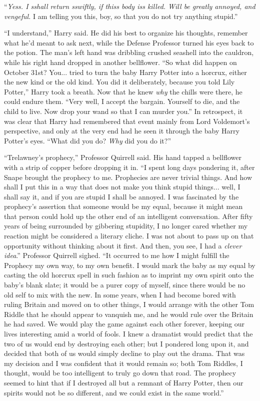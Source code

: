 ``\emph{Yess. I sshall return sswiftly, if thiss body iss killed. Will be greatly annoyed, and vengeful.} I am telling you this, boy, so that you do not try anything stupid.''

``I understand,'' Harry said. He did his best to organize his thoughts, remember what he'd meant to ask next, while the Defense Professor turned his eyes back to the potion. The man's left hand was dribbling crushed seashell into the cauldron, while his right hand dropped in another bellflower. ``So what did happen on October 31st? You... tried to turn the baby Harry Potter into a horcrux, either the new kind or the old kind. You did it deliberately, because you told Lily Potter,'' Harry took a breath. Now that he knew \emph{why} the chills were there, he could endure them. ``Very well, I accept the bargain. Yourself to die, and the child to live. Now drop your wand so that I can murder you.'' In retrospect, it was clear that Harry had remembered that event mainly from Lord Voldemort's perspective, and only at the very end had he seen it through the baby Harry Potter's eyes. ``What did you do? \emph{Why} did you do it?''

``Trelawney's prophecy,'' Professor Quirrell said. His hand tapped a bellflower with a strip of copper before dropping it in. ``I spent long days pondering it, after Snape brought the prophecy to me. Prophecies are never trivial things. And how shall I put this in a way that does not make you think stupid things... well, I shall say it, and if you are stupid I shall be annoyed. I was fascinated by the prophecy's assertion that someone would be my equal, because it might mean that person could hold up the other end of an intelligent conversation. After fifty years of being surrounded by gibbering stupidity, I no longer cared whether my reaction might be considered a literary cliche. I was not about to pass up on that opportunity without thinking about it first. And then, you see, I had a \emph{clever idea}.'' Professor Quirrell sighed. ``It occurred to me how I might fulfill the Prophecy my own way, to my own benefit. I would mark the baby as my equal by casting the old horcrux spell in such fashion as to imprint my own spirit onto the baby's blank slate; it would be a purer copy of myself, since there would be no old self to mix with the new. In some years, when I had become bored with ruling Britain and moved on to other things, I would arrange with the other Tom Riddle that he should appear to vanquish me, and he would rule over the Britain he had saved. We would play the game against each other forever, keeping our lives interesting amid a world of fools. I knew a dramatist would predict that the two of us would end by destroying each other; but I pondered long upon it, and decided that both of us would simply decline to play out the drama. That was my decision and I was confident that it would remain so; both Tom Riddles, I thought, would be too intelligent to truly go down that road. The prophecy seemed to hint that if I destroyed all but a remnant of Harry Potter, then our spirits would not be so different, and we could exist in the same world.''

